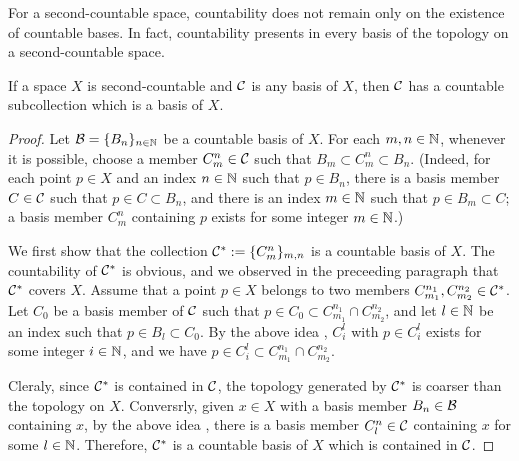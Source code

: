 For a second-countable space, countability does not remain only on the existence of countable bases.
In fact, countability presents in every basis of the topology on a second-countable space.
\begin{prop}
    If a space $X$ is second-countable and ${\mathcal{C}}$ is any basis of $X$, then ${\mathcal{C}}$ has a countable subcollection which is a basis of $X$.
\end{prop}
\begin{proof}
    Let ${\mathcal{B}}=\{B_n\}_{n\in{\mathbb{N}}}$ be a countable basis of $X$.
    For each $m, n\in{\mathbb{N}}$, whenever it is possible, choose a member $C_m^n\in{\mathcal{C}}$ such that $B_m\subset C_m^n\subset B_n$.
    (Indeed, \color{magenta}for each point $p\in X$ and an index $n\in{\mathbb{N}}$ such that $p\in B_n$, there is a basis member $C\in{\mathcal{C}}$ such that $p\in C\subset B_n$, and there is an index $m\in{\mathbb{N}}$ such that $p\in B_m\subset C$\color{black}; a basis member $C_m^n$ containing $p$ exists for some integer $m\in{\mathbb{N}}$.)
    
    We first show that the collection ${\mathcal{C}}^*:=\{C_m^n\}_{m, n}$ is a countable basis of $X$.
    The countability of ${\mathcal{C}}^*$ is obvious, and we observed in the preceeding paragraph that ${\mathcal{C}}^*$ covers $X$.
    Assume that a point $p\in X$ belongs to two members $C_{m_1}^{n_1}, C_{m_2}^{n_2}\in{\mathcal{C}}^*$.
    Let $C_0$ be a basis member of ${\mathcal{C}}$ such that $p\in C_0\subset C_{m_1}^{n_1}\cap C_{m_2}^{n_2}$, and let $l\in{\mathbb{N}}$ be an index such that $p\in B_l\subset C_0$.
    By \color{magenta}the above idea \color{black}, $C_i^l$ with $p\in C_i^l$ exists for some integer $i\in{\mathbb{N}}$, and we have $p\in C_i^l\subset C_{m_1}^{n_1}\cap C_{m_2}^{n_2}$.

    Cleraly, since ${\mathcal{C}}^*$ is contained in ${\mathcal{C}}$, the topology generated by ${\mathcal{C}}^*$ is coarser than the topology on $X$.
    Conversrly, given $x\in X$ with a basis member $B_n\in{\mathcal{B}}$ containing $x$, by \color{magenta}the above idea \color{black}, there is a basis member $C_l^n\in{\mathcal{C}}$ containing $x$ for some $l\in{\mathbb{N}}$.
    Therefore, ${\mathcal{C}}^*$ is a countable basis of $X$ which is contained in ${\mathcal{C}}$.
\end{proof}

